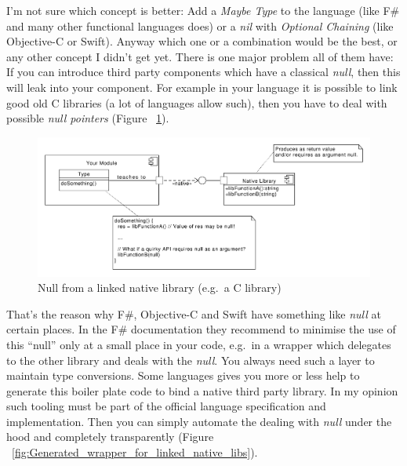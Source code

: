 \documentclass[11pt, a4paper]{report}
\begin{document}
I'm not sure which concept is better: Add a \textit{Maybe Type} to the language (like F\# and many other functional languages does) or a \textit{nil} with \textit{Optional Chaining} (like Objective-C or Swift). Anyway which one or a combination would be the best, or any other concept I didn't get yet. There is one major problem all of them have: If you can introduce third party components which have a classical \textit{null}, then this will leak into your component. For example in your language it is possible to link good old C libraries (a lot of languages allow such), then you have to deal with possible \textit{null pointers} (Figure ~\ref{fig:Null_from_linked_native_libs}). 

\begin{figure}[ht]
    \centering
    \includegraphics[width=350pt]{grafics/Null_from_linked_native_libs.pdf}
    \caption{Null from a linked native library (e.g.\ a C library)}
    \label{fig:Null_from_linked_native_libs}
\end{figure}

That's the reason why F\#, Objective-C and Swift have something like \textit{null} at certain places. In the F\# documentation they recommend to minimise the use of this ``null'' only at a small place in your code, e.g.\ in a wrapper which delegates to the other library and deals with the \textit{null}. You always need such a layer to maintain type conversions. Some languages gives you more or less help to generate this boiler plate code to bind a native third party library. In my opinion such tooling must be part of the official language specification and implementation. Then you can simply automate the dealing with \textit{null} under the hood and completely transparently (Figure
 ~\ref{fig:Generated_wrapper_for_linked_native_libs}).
\end{document}
